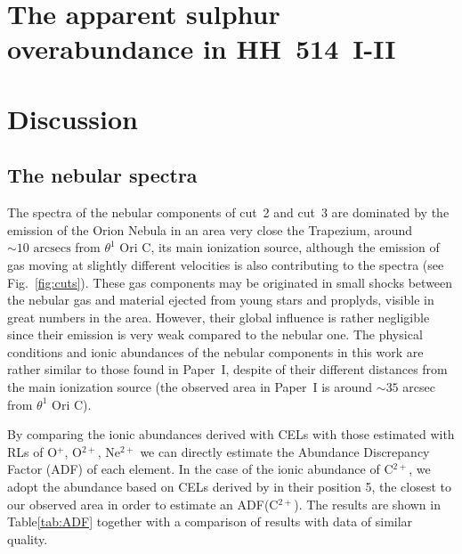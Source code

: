 \documentclass[fleqn,usenatbib]{mnras}
\begin{document}
\section{The apparent sulphur overabundance in HH~514~I-II}
\label{sec:over_sulphur}












\section{Discussion}


\subsection{The nebular spectra }
\label{subsec:disc_neb_comp}

The spectra of the nebular components of cut~2 and cut~3 are dominated by the emission of the Orion Nebula in an area very close the Trapezium, around $\sim 10 \text{ arcsecs}$ from $\theta^{1} \text{ Ori C}$, its main ionization source, although the emission of gas moving at slightly different velocities is also contributing to the spectra (see Fig.~\ref{fig:cuts}). These gas components may be originated in small shocks between the nebular gas and material ejected from young stars and proplyds, visible in great numbers in the area. However, their global influence is rather negligible since their emission is very weak compared to the nebular one. The physical conditions and ionic abundances of the nebular components in this work are rather similar to those found in Paper~I, despite of their different distances from the main ionization source (the observed area in Paper~I is around $\sim 35$ arcsec from $\theta^{1} \text{ Ori C}$).%

By comparing the ionic abundances derived with CELs with those estimated with RLs of O$^{+}$, O$^{2+}$, Ne$^{2+}$ we can directly estimate the Abundance Discrepancy Factor (ADF) of each element. In the case of the ionic abundance of C$^{2+}$, we adopt the abundance based on CELs derived by \citet{walter92} in their position 5, the closest to our observed area in order to estimate an ADF(C$^{2+}$). The results are shown in Table\ref{tab:ADF} together with a comparison of results with data of similar quality.
\end{document}

